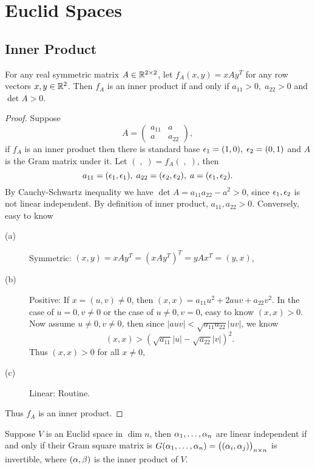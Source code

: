\chapter{Euclid Spaces}
\section{Inner Product}
\begin{pro}%
	For any real symmetric matrix $A\in\mathbb{R}^{2\times 2}$, let $f_A(x,y)=xAy^T$ for any row vectors $x,y\in \mathbb{R}^2$. Then $f_A$ is an inner product if and only if $a_{11}>0,\;a_{22}>0$ and $\det A>0$.
\end{pro}
\begin{proof}
	Suppose 
	\[A=\begin{pmatrix} a_{11} & a\\ a & a_{22}\end{pmatrix},\]
	if $f_A$ is an inner product then there is standard base $\epsilon_1=(1,0),\;\epsilon_2=(0,1)$ and $A$ is the Gram matrix under it. Let $(\;,\;)=f_A(\;,\;)$, then 
	\[a_{11}=(\epsilon_1,\epsilon_1),\;a_{22}=(\epsilon_2,\epsilon_2),\;a=(\epsilon_1,\epsilon_2).\]
	By Cauchy-Schwartz inequality we have $\det A=a_{11}a_{22}-a^2>0$, since $\epsilon_1,\epsilon_2$ is not linear independent. By definition of inner product, $a_{11},a_{22}>0$. Conversely, easy to know
	\begin{description}
		\item[(a)]Symmetric: $(x,y)=xAy^T=(xAy^T)^T=yAx^T=(y,x)$,
		\item[(b)]Positive: If $x=(u,v)\neq 0$, then $(x,x)=a_{11}u^2+2auv+a_{22}v^2$. In the case of $u=0,v\neq 0$ or the case of $u\neq 0,v=0$, easy to know $(x,x)>0$. Now assume $u\neq 0,v\neq 0$, then since $|auv|<\sqrt{a_{11}a_{22}}|uv|$, we know 
		\[(x,x)>(\sqrt{a_{11}}|u|-\sqrt{a_{22}}|v|)^2.\]
		Thus $(x,x)>0$ for all $x\neq 0$,
		\item[(c)]Linear: Routine.
	\end{description}
	Thus $f_A$ is an inner product.
\end{proof}

\begin{pro}%
	Suppose $V$ is an Euclid space in $\dim n$, then $\alpha_1,\dots,\alpha_n$ are linear independent if and only if their Gram square matrix is $G(\alpha_1,\dots,\alpha_n)=\big((\alpha_i,\alpha_j)\big)_{n\times n}$ is invertible, where $(\alpha,\beta)$ is the inner product of $V$.
\end{pro}

